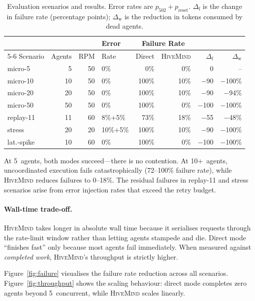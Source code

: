 \documentclass[11pt,twocolumn]{article}
\newcommand{\hm}{\textsc{HiveMind}}
\begin{document}
\begin{table}[t]
\centering
\small
\caption{Evaluation scenarios and results.  Error rates are
$p_{502} + p_{\text{reset}}$.  $\Delta_{\text{f}}$ is the
change in failure rate (percentage points);
$\Delta_{\text{w}}$ is the reduction in tokens consumed by
dead agents.}
\label{tab:scenarios}
\label{tab:results}
\begin{tabular}{@{}lrrl rr rr@{}}
\toprule
 & & & Error & \multicolumn{2}{c}{Failure Rate} & & \\
\cmidrule(lr){5-6}
Scenario & Agents & RPM & Rate & Direct & \hm{} & $\Delta_{\text{f}}$ & $\Delta_{\text{w}}$ \\
\midrule
micro-5    & 5  & 50 & 0\%      &   0\% &  0\% & 0    & --      \\
micro-10   & 10 & 50 & 0\%      & 100\% & 10\% & $-$90  & $-$100\% \\
micro-20   & 20 & 50 & 0\%      & 100\% & 10\% & $-$90  & $-$94\%  \\
micro-50   & 50 & 50 & 0\%      & 100\% &  0\% & $-$100 & $-$100\% \\
replay-11  & 11 & 60 & 8\%+5\%  &  73\% & 18\% & $-$55  & $-$48\%  \\
stress     & 20 & 20 & 10\%+5\% & 100\% & 10\% & $-$90  & $-$100\% \\
lat.-spike & 10 & 60 & 0\%      & 100\% &  0\% & $-$100 & $-$100\% \\
\bottomrule
\end{tabular}
\end{table}

At 5~agents, both modes succeed---there is no contention.
At 10+~agents, uncoordinated execution fails catastrophically
(72--100\% failure rate), while \hm{} reduces failures to
0--18\%.  The residual failures in replay-11 and stress
scenarios arise from error injection rates that exceed the
retry budget.

\paragraph{Wall-time trade-off.}
\hm{} takes longer in absolute wall time because it serialises
requests through the rate-limit window rather than letting
agents stampede and die.  Direct mode ``finishes fast'' only
because most agents fail immediately.  When measured against
\emph{completed work}, \hm{}'s throughput is strictly higher.

Figure~\ref{fig:failure} visualises the failure rate reduction
across all scenarios.  Figure~\ref{fig:throughput} shows the
scaling behaviour: direct mode completes zero agents beyond
5~concurrent, while \hm{} scales linearly.
\end{document}
